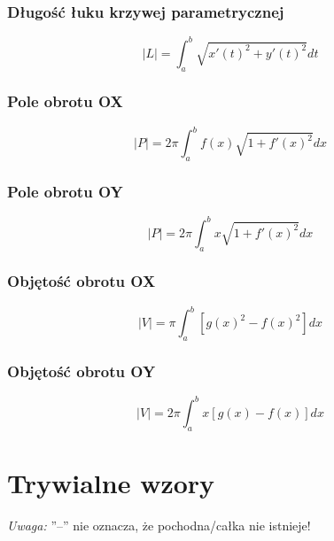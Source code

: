\documentclass[11pt]{article}
\begin{document}
\subsubsection{Długość łuku krzywej parametrycznej}
\begin{equation}
|L| = \int_a^b \sqrt{x'(t)^2 + y'(t)^2}dt
\end{equation}

\subsubsection{Pole obrotu OX}
\begin{equation}
|P| = 2\pi \int_a^b f(x) \sqrt{1 + f'(x)^2} dx
\end{equation}

\subsubsection{Pole obrotu OY}
\begin{equation}
|P| = 2\pi \int_a^b x \sqrt{1 + f'(x)^2} dx
\end{equation}

\subsubsection{Objętość obrotu OX}
\begin{equation}
	|V| = \pi \int_a^b \left[g(x)^2 - f(x)^2\right] dx
\end{equation}

\subsubsection{Objętość obrotu OY}
\begin{equation}
	|V| = 2\pi \int_a^b x\left[g(x) - f(x)\right] dx
\end{equation}

\pagebreak

\section{Trywialne wzory}

\emph{Uwaga:} ''--'' nie oznacza, że pochodna/całka nie istnieje!
\end{document}
